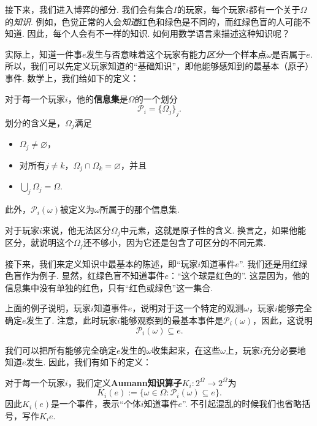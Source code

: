 接下来，我们进入博弈的部分. 我们会有集合$I$的玩家，每个玩家$i$都有一个关于$\Omega$的\textit{知识}. 例如，色觉正常的人会\textit{知道}红色和绿色是不同的，而红绿色盲的人可能不知道. 因此，每个人会有不一样的知识. 如何用数学语言来描述这种知识呢？

实际上，知道一件事$e$发生与否意味着这个玩家有能力\textit{区分}一个样本点$\omega$是否属于$e$. 所以，我们可以先定义玩家知道的“基础知识”，即他能够感知到的最基本（原子）事件. 数学上，我们给如下的定义：

\begin{definition}[信息集]
    对于每一个玩家$i$，他的\textbf{信息集}是$\Omega$的一个划分
    \[\mathcal P_i = \{\Omega_j\}_j.\]
    划分的含义是，$\Omega_j$满足
    \begin{itemize}
        \item $\Omega_j\neq \varnothing$，
        \item 对所有$j\neq k$，$\Omega_j\cap\Omega_k=\varnothing$，并且
        \item $\bigcup_j\Omega_j=\Omega$.
    \end{itemize}
    此外，$\mathcal P_i(\omega)$被定义为$\omega$所属于的那个信息集.
\end{definition}

对于玩家$i$来说，他无法区分$\Omega_j$中元素，这就是原子性的含义. 换言之，如果他能区分，就说明这个$\Omega_j$还不够小，因为它还是包含了可区分的不同元素. 

接下来，我们来定义知识中最基本的陈述，即“玩家$i$知道事件$e$”. 我们还是用红绿色盲作为例子. 显然，红绿色盲不知道事件$e$：“这个球是红色的”. 这是因为，他的信息集中没有单独的红色，只有“红色或绿色”这一集合. 

上面的例子说明，玩家$i$知道事件$e$，说明对于这一个特定的观测$\omega$，玩家$i$能够完全确定$e$发生了. 注意，此时玩家$i$能够观察到的最基本事件是$\mathcal P_i(\omega)$，因此，这说明
\[\mathcal P_i(\omega)\subseteq e.\]

我们可以把所有能够完全确定$e$发生的$\omega$收集起来，在这些$\omega$上，玩家$i$充分必要地知道$e$发生. 因此，我们有如下的定义：

\begin{definition}[Aumann知识算子]
    对于每一个玩家$i$，我们定义\textbf{Aumann知识算子}$K_i:2^\Omega\to 2^\Omega$为
    \[K_i(e):=\{\omega\in\Omega:\mathcal P_i(\omega)\subseteq e\}.\]
    因此$K_i(e)$是一个事件，表示“个体$i$知道事件$e$”. 不引起混乱的时候我们也省略括号，写作$K_ie$.
\end{definition}

